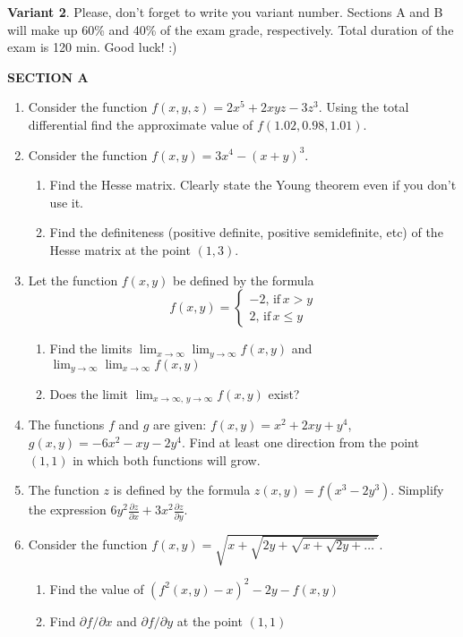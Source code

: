 \documentclass[12pt,a4paper]{article}
\begin{document}
\newpage
\thispagestyle{empty}
\textbf{Variant 2}. Please, don't forget to write you variant number. Sections A and B will make up 60\% and 40\% of the exam grade, respectively. Total duration of the exam is 120 min. Good luck! :) 



\textbf{SECTION A}

\begin{enumerate}

\item Consider the function $f(x,y,z)=2x^5+2xyz-3z^3$. Using the total differential find the approximate value of $f(1.02,0.98,1.01)$.

\item Consider the function $f(x,y)=3x^4-(x+y)^3$. 
\begin{enumerate}
\item Find the Hesse matrix. Clearly state the Young theorem even if you don't use it.
\item Find the definiteness (positive definite, positive semidefinite, etc) of the Hesse matrix at the point $(1,3)$.
\end{enumerate}

\item Let the function $f(x,y)$ be defined by the formula
\[
f(x,y)=\begin{cases}
-2, \, \text{if} \, x>y \\
2, \, \text{if} \, x\leq y
\end{cases}
\]

\begin{enumerate}
\item Find the limits $\lim_{x\to\infty}\lim_{y\to \infty} f(x,y)$ and $\lim_{y\to\infty}\lim_{x\to \infty} f(x,y)$
\item Does the limit $\lim_{x\to\infty, \, y\to \infty} f(x,y)$ exist?
\end{enumerate}


\item The functions $f$ and $g$ are given: $f(x,y)=x^2+2xy+y^4$, $g(x,y)=-6x^2-xy-2y^4$. Find at least one direction from the point $(1,1)$ in which both functions will grow.

\item The function $z$ is defined by the formula $z(x,y)=f(x^3-2y^3)$. Simplify the expression $6y^2\frac{\partial z}{\partial x}+3x^2\frac{\partial z}{\partial y}$. 

\item Consider the function $f(x,y)=\sqrt{x+\sqrt{2y+\sqrt{x+\sqrt{2y + \ldots }}}}$. 
\begin{enumerate}
\item Find the value of $(f^2(x,y)-x)^2-2y-f(x,y)$
\item Find $\partial f/\partial x$ and $\partial f/\partial y$ at the point $(1,1)$
\end{enumerate}


\end{enumerate}
\end{document}
